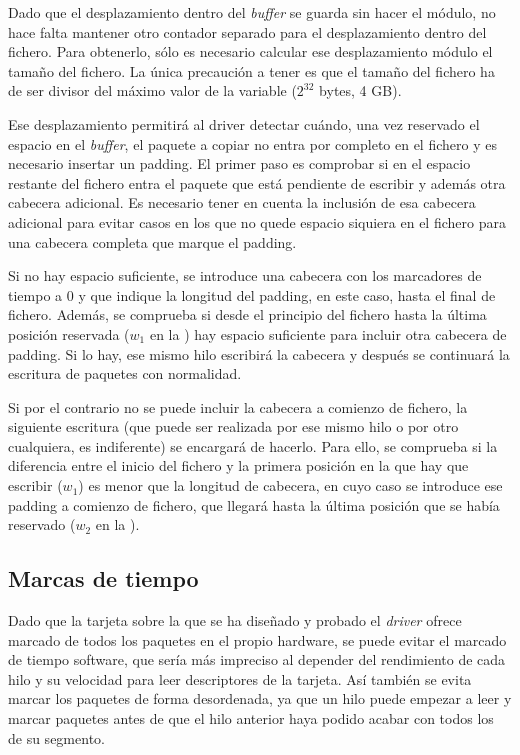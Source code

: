 \documentclass[oneside, draft]{epstfg}
\begin{document}
Dado que el desplazamiento dentro del \textit{buffer} se guarda sin hacer el módulo, no hace falta mantener otro contador separado para el desplazamiento dentro del fichero. Para obtenerlo, sólo es necesario calcular ese desplazamiento módulo el tamaño del fichero. La única precaución a tener es que el tamaño del fichero ha de ser divisor del máximo valor de la variable ($2^{32}$ bytes, 4 GB).

Ese desplazamiento permitirá al \gls{driver} detectar cuándo, una vez reservado el espacio en el \textit{buffer}, el paquete a copiar no entra por completo en el fichero y es necesario insertar un \gls{padding}. El primer paso es comprobar si en el espacio restante del fichero entra el paquete que está pendiente de escribir y además otra cabecera adicional. Es necesario tener en cuenta la inclusión de esa cabecera adicional para evitar casos en los que no quede espacio siquiera en el fichero para una cabecera completa que marque el \gls{padding}.

Si no hay espacio suficiente, se introduce una cabecera con los marcadores de tiempo a 0 y que indique la longitud del \gls{padding}, en este caso, hasta el final de fichero. Además, se comprueba si desde el principio del fichero hasta la última posición reservada ($w_1$ en la ) hay espacio suficiente para incluir otra cabecera de \gls{padding}. Si lo hay, ese mismo hilo escribirá la cabecera y después se continuará la escritura de paquetes con normalidad.

Si por el contrario no se puede incluir la cabecera a comienzo de fichero, la siguiente escritura (que puede ser realizada por ese mismo hilo o por otro cualquiera, es indiferente) se encargará de hacerlo. Para ello, se comprueba si la diferencia entre el inicio del fichero y la primera posición en la que hay que escribir ($w_1$) es menor que la longitud de cabecera, en cuyo caso se introduce ese \gls{padding} a comienzo de fichero, que llegará hasta la última posición que se había reservado ($w_2$ en la ).

\subsection{Marcas de tiempo}

Dado que la tarjeta sobre la que se ha diseñado y probado el \textit{driver} ofrece marcado de todos los paquetes en el propio hardware, se puede evitar el marcado de tiempo software, que sería más impreciso al depender del rendimiento de cada hilo y su velocidad para leer descriptores de la tarjeta. Así también se evita marcar los paquetes de forma desordenada, ya que un hilo puede empezar a leer y marcar paquetes antes de que el hilo anterior haya podido acabar con todos los de su segmento.
\end{document}
